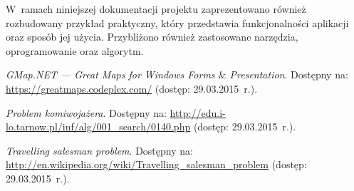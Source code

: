 \documentclass[12pt,a4paper]{report}
\begin{document}
W~ramach niniejszej dokumentacji projektu zaprezentowano również rozbudowany przykład praktyczny, który przedstawia funkcjonalności aplikacji oraz sposób jej użycia. Przybliżono również zastosowane narzędzia, oprogramowanie oraz algorytm.

\clearpage
{}
{}
\begin{thebibliography}{99}

 \textit{GMap.NET --- Great Maps for Windows Forms $\&$ Presentation}. Dostępny na: \url{https://greatmaps.codeplex.com/} (dostęp: 29.03.2015~r.).

 \textit{Problem komiwojażera}. Dostępny na: \url{http://edu.i-lo.tarnow.pl/inf/alg/001_search/0140.php} (dostęp: 29.03.2015~r.).

 \textit{Travelling salesman problem}. Dostępny na: \url{http://en.wikipedia.org/wiki/Travelling_salesman_problem} (dostęp: 29.03.2015~r.).

\end{thebibliography}

\clearpage
{}
{}
\listoffigures
\end{document}
